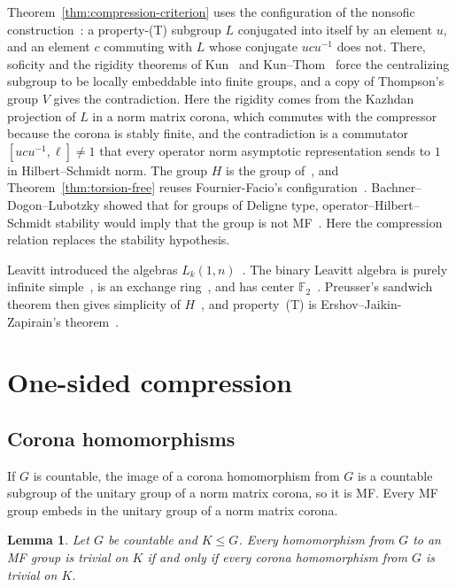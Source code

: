 \documentclass[11pt]{amsart}
\newcommand{\leanverified}[2]{\ignorespaces}
\newtheorem{lemma}[theorem]{Lemma}
\theoremstyle{plain}
\newcommand{\F}{\mathbb F}
\begin{document}
Theorem~\ref{thm:compression-criterion} uses the configuration of the
nonsofic construction~\cite[Proposition~2.3]{OAI}: a property-\textup{(T)}
subgroup $L$ conjugated into itself by an element $u$, and an element $c$
commuting with $L$ whose conjugate $ucu^{-1}$ does not.  There, soficity
and the rigidity theorems of Kun~\cite{Kun16} and Kun--Thom~\cite{KT19}
force the centralizing subgroup to be locally embeddable into finite
groups, and a copy of Thompson's group $V$ gives the contradiction.  Here
the rigidity comes from the Kazhdan projection of $L$ in a norm matrix
corona, which commutes with the compressor because the corona is stably
finite, and the contradiction is a commutator $[ucu^{-1},\ell]\ne1$
that every operator norm asymptotic representation sends to $1$ in
Hilbert--Schmidt norm.  The group $H$ is the group of~\cite{OAI}, and
Theorem~\ref{thm:torsion-free} reuses Fournier-Facio's
configuration~\cite{FFF}.  Bachner--Dogon--Lubotzky showed that for groups
of Deligne type, operator--Hilbert--Schmidt stability would imply that the
group is not MF~\cite[Proposition~1.5]{BDL}.  Here the compression
relation replaces the stability hypothesis.

Leavitt introduced the algebras $L_k(1,n)$~\cite{Leavitt}.  The binary
Leavitt algebra is purely infinite simple~\cite{AbramsAranda}, is an
exchange ring~\cite{AraExchange}, and has center
$\F_2$~\cite{ArandaCrow}.  Preusser's sandwich theorem then gives
simplicity of $H$~\cite{Preusser}, and property~\textup{(T)} is
Ershov--Jaikin-Zapirain's theorem~\cite[Theorem~1.1]{EJZ}.

\section{One-sided compression}
\label{sec:compression-radical}

\subsection{Corona homomorphisms}

If $G$ is countable, the image of a corona homomorphism from $G$ is a
countable subgroup of the unitary group of a norm matrix corona, so it
is MF\@.  Every MF group embeds
in the unitary group of a norm matrix corona.
\leanverified{Manuscript/OneSidedMFRadical/PrintedDefinitions}{GroupApproximation.Manuscript.OneSidedMFRadical.manuscriptCoronaImagesAndTargets}

\begin{lemma}\label{prop:mf-residual-calculus}
Let $G$ be countable and $K\le G$.  Every homomorphism from $G$ to an MF
group is trivial on $K$ if and only if every corona homomorphism from $G$
is trivial on $K$.
\leanverified{Manuscript/OneSidedMFRadical/LiteralMFClosure}{GroupApproximation.Manuscript.OneSidedMFRadical.manuscriptMFResidualCalculusLiteral}
\end{lemma}
\end{document}
